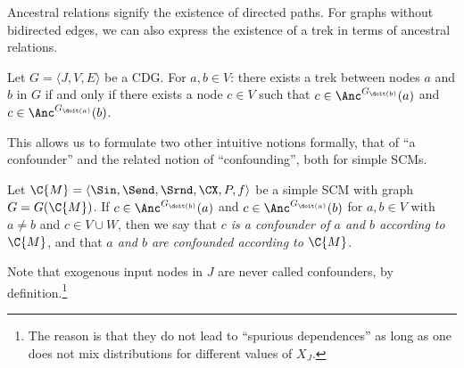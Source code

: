 Ancestral relations signify the existence of directed paths.
For graphs without bidirected edges, we can also express the existence of a trek in terms of ancestral relations.
\begin{Prp}
  Let $G = \langle J, V, E \rangle$ be a CDG. For $a,b \in V$:
  there exists a trek between nodes $a$ and $b$ in $G$ if and only if there exists a node $c \in V$ such that $c \in \Anc^{G_{\doit(b)}}(a)$ and $c \in \Anc^{G_{\doit(a)}}(b)$.
\end{Prp}
This allows us to formulate two other intuitive notions formally, that of ``a confounder'' and the related notion
of ``confounding'', both for simple SCMs.
\begin{Def}
  Let $\C{M} = \langle \Sin, \Send, \Srnd, \CX, P, f \rangle$ be a simple SCM with graph $G = G(\C{M})$.
  If $c \in \Anc^{G_{\doit(b)}}(a)$ and $c \in \Anc^{G_{\doit(a)}}(b)$ for $a, b \in V$ with $a \ne b$ and $c \in V \cup W$, then
      we say that \emph{$c$ is a confounder of $a$ and $b$ according to $\C{M}$}, and that \emph{$a$ and $b$ are confounded according to $\C{M}$}.
\end{Def}
Note that exogenous input nodes in $J$ are never called confounders, by definition.\footnote{The reason is that they do not lead to ``spurious dependences'' as long as one does not mix distributions for different values of $X_J$.}

